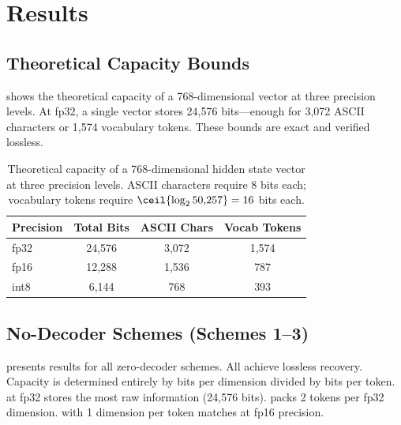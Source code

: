 \section{Results}
\label{sec:results}

\subsection{Theoretical Capacity Bounds}
\label{sec:results_theory}

 shows the theoretical capacity of a 768-dimensional vector at three precision levels. At fp32, a single vector stores 24,576 bits---enough for 3,072 ASCII characters or 1,574 vocabulary tokens. These bounds are exact and verified lossless.

\begin{table}[t]
    \centering
    \caption{Theoretical capacity of a 768-dimensional hidden state vector at three precision levels. ASCII characters require 8 bits each; vocabulary tokens require $\ceil{\log_2 50{,}257} = 16$ bits each.}
    \begin{tabular}{@{}lccc@{}}
        \toprule
        \textbf{Precision} & \textbf{Total Bits} & \textbf{ASCII Chars} & \textbf{Vocab Tokens} \\
        \midrule
        fp32 & 24,576 & 3,072 & 1,574 \\
        fp16 & 12,288 & 1,536 & 787 \\
        int8 & 6,144 & 768 & 393 \\
        \bottomrule
    \end{tabular}
    \label{tab:theory}
\end{table}

\subsection{No-Decoder Schemes (Schemes 1--3)}
\label{sec:results_nodecoder}

 presents results for all zero-decoder schemes. All achieve lossless recovery. Capacity is determined entirely by bits per dimension divided by bits per token. \asciienc at fp32 stores the most raw information (24,576 bits). \vocabenc packs 2 tokens per fp32 dimension. \vecwalk with 1 dimension per token matches \vocabenc at fp16 precision.

